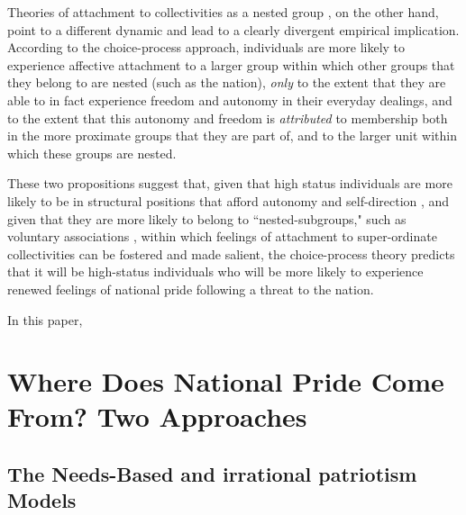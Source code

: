 \documentclass[12pt,letterpaper]{article}
\begin{document}
Theories of attachment to collectivities as a nested group \citep{lawler1992affective-8c8, mueller1999commitment}, on the other hand, point to a different dynamic and lead to a clearly divergent empirical implication. According to the choice-process approach, individuals are more likely to experience affective attachment to a larger group within which other groups that they belong to are nested (such as the nation), \textit{only} to the extent that they are able to in fact experience freedom and autonomy in their everyday dealings, and to the extent that this autonomy and freedom is \textit{attributed} to membership both in the more proximate groups that they are part of, and to the larger unit within which these groups are nested. 

These two propositions suggest that, given that high status individuals are more likely to be in structural positions that afford autonomy and self-direction \citep{kohn1969class, kohn1977class-ee1, kohn1978reciprocal-f1b}, and given that they are more likely to belong to ``nested-subgroups," such as voluntary associations \citep{bell1956social, freeman1957correlates, janoski1996pathways, knoke1986associations, mcpherson1981dynamic, scott1957membership, tomeh1973formal, dederichs2024join-411}, within which feelings of attachment to super-ordinate collectivities can be fostered and made salient, the choice-process theory predicts that it will be high-status individuals who will be more likely to experience renewed feelings of national pride following a threat to the nation.

In this paper, 

\section{Where Does National Pride Come From? Two Approaches}

\subsection{The Needs-Based and irrational patriotism Models}
\end{document}
